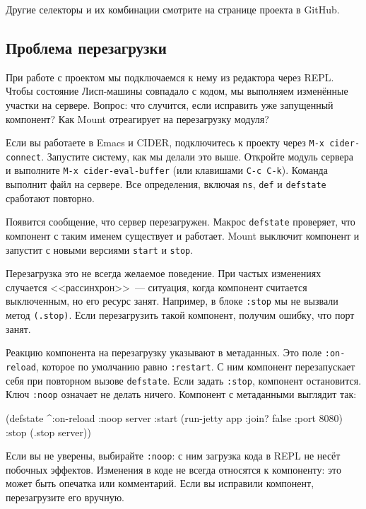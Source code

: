 \noindent
Другие селекторы и их комбинации смотрите на странице проекта в GitHub.

\subsection{Проблема перезагрузки}

При работе с проектом мы подключаемся к нему из редактора через REPL. Чтобы
состояние Лисп-машины совпадало с кодом, мы выполняем изменённые участки на
сервере. Вопрос: что случится, если исправить уже запущенный компонент? Как
Mount отреагирует на перезагрузку модуля?


Если вы работаете в Emacs и CIDER, подключитесь к проекту через
\verb|M-x cider-connect|. Запустите систему, как мы делали это выше.
Откройте модуль сервера и выполните \verb|M-x cider-eval-buffer|
(или клавишами \verb|C-c C-k|). Команда выполнит файл на сервере.
Все определения, включая \verb|ns|, \verb|def| и \verb|defstate|
сработают повторно.

Появится сообщение, что сервер перезагружен. Макрос \verb|defstate| проверяет,
что компонент с таким именем существует и работает. Mount выключит компонент и
запустит с новыми версиями \verb|start| и \verb|stop|.

Перезагрузка это не всегда желаемое поведение. При частых изменениях случается
<<рассинхрон>>~--- ситуация, когда компонент считается выключенным, но его
ресурс занят. Например, в блоке \verb|:stop| мы не вызвали метод
\verb|(.stop)|. Если перезагрузить такой компонент, получим ошибку, что порт
занят.

Реакцию компонента на перезагрузку указывают в метаданных. Это поле
\verb|:on-reload|, которое по умолчанию равно \verb|:restart|. С ним
компонент перезапускает себя при повторном вызове \verb|defstate|. Если задать
\verb|:stop|, компонент остановится. Ключ \verb|:noop| означает не делать
ничего. Компонент с метаданными выглядит так:

\begin{english}
  \begin{clojure}
(defstate ^{:on-reload :noop} server
  :start (run-jetty app {:join? false :port 8080})
  :stop (.stop server))
  \end{clojure}
\end{english}

Если вы не уверены, выбирайте \verb|:noop|: с ним загрузка кода в REPL не
несёт побочных эффектов. Изменения в коде не всегда относятся к компоненту: это
может быть опечатка или комментарий. Если вы исправили компонент, перезагрузите
его вручную.

